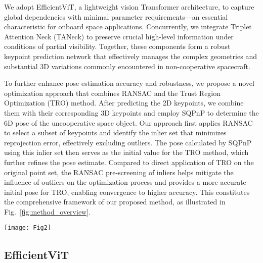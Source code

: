 \documentclass[a4paper,fleqn]{cas-sc}
\begin{document}
We adopt EfficientViT, a lightweight vision Transformer architecture, to capture global dependencies with minimal parameter requirements—an essential characteristic for onboard space applications. Concurrently, we integrate Triplet Attention Neck (TANeck) to preserve crucial high-level information under conditions of partial visibility. Together, these components form a robust keypoint prediction network that effectively manages the complex geometries and substantial 3D variations commonly encountered in non-cooperative spacecraft.

To further enhance pose estimation accuracy and robustness, we propose a novel optimization approach that combines RANSAC and the Trust Region Optimization (TRO) \citep{coleman1996interior} method. After predicting the 2D keypoints, we combine them with their corresponding 3D keypoints and employ SQPnP \citep{terzakis2020consistently} to determine the 6D pose of the uncooperative space object. Our approach first applies RANSAC to select a subset of keypoints and identify the inlier set that minimizes reprojection error, effectively excluding outliers. The pose calculated by SQPnP using this inlier set then serves as the initial value for the TRO method, which further refines the pose estimate. Compared to direct application of TRO on the original point set, the RANSAC pre-screening of inliers helps mitigate the influence of outliers on the optimization process and provides a more accurate initial pose for TRO, enabling convergence to higher accuracy. This constitutes the comprehensive framework of our proposed method, as illustrated in Fig.~\ref{fig:method_overview}.

\begin{figure*}[!htbp]
	\centering	
	\texttt{[image: Fig2]}
	\caption{Overview of the proposed method and its main components. (a) The overall pipeline of the method. (b) Architecture of the EfficientViT Block. H$_i$ ($i$ from 1 to $n$) represents the $i$-th self-attention head, FFN represents the feed-forward network. (c) Structure of Triplet Attention. R$_{wc}$, R$_{cw}$, R$_{hc}$, R$_{ch}$ represent width-channel permutation, channel-width permutation, height-channel permutation, and channel-height permutation respectively, while Avg represents average pooling.}
	\label{fig:method_overview}
\end{figure*}

\subsection{EfficientViT}
\end{document}

